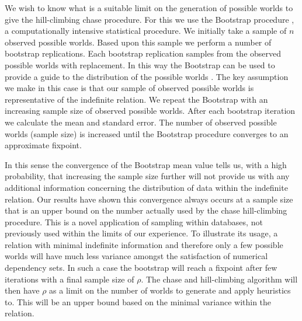 We wish to know what is a suitable limit on the generation of possible 
worlds to give the hill-climbing
chase procedure. For this we use the Bootstrap procedure \cite{et86,et93}, a computationally intensive statistical procedure. We
initially take a sample of $n$ observed possible worlds. Based upon this sample
we perform a number of bootstrap replications. Each bootstrap
replication samples from the observed possible worlds with replacement.
In this way the Bootstrap can be used to provide a guide to the 
distribution of the possible worlds \cite{dop94}. The key assumption
we make in this 
case is that our sample of observed possible worlds is representative
of the indefinite relation. We repeat the Bootstrap with an increasing sample size of observed possible
worlds. After each bootstrap iteration we calculate the mean and 
standard error.  The number of observed possible worlds (sample size)
 is increased
until the Bootstrap procedure converges to an approximate fixpoint.

In this sense the convergence of the Bootstrap mean value
tells us, with a high probability, that
increasing the sample size further will not provide us with any
additional information concerning the distribution of data within the
indefinite relation. Our 
results have shown this convergence always occurs at a sample size 
that is an upper bound on the 
number actually used by the chase hill-climbing procedure. This is a novel
application of sampling within databases, not previously used within
the limits of our experience.  To illustrate its usage, a relation with 
minimal indefinite information and therefore only
a few possible worlds will have much less variance amongst the satisfaction
of numerical dependency sets. In such a case the bootstrap will reach
a fixpoint after few iterations with a final sample size of $\rho$. The
chase and hill-climbing
algorithm will then have $\rho$ as a limit on the number of worlds to generate and
apply heuristics to. This will be an upper bound based on the minimal
variance within the relation.

\smallskip

